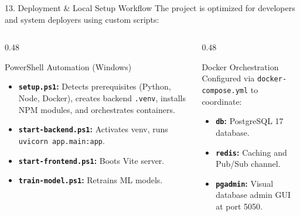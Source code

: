 \documentclass[10pt,aspectratio=169]{beamer}
\begin{document}
\begin{frame}{13. Deployment \& Local Setup Workflow}
    The project is optimized for developers and system deployers using custom scripts:
    
    \begin{columns}[T]
        \begin{column}{0.48\textwidth}
            \begin{block}{PowerShell Automation (Windows)}
                \begin{itemize}
                    \item \textbf{\texttt{setup.ps1}:} Detects prerequisites (Python, Node, Docker), creates backend \texttt{.venv}, installs NPM modules, and orchestrates containers.
                    \item \textbf{\texttt{start-backend.ps1}:} Activates venv, runs \texttt{uvicorn app.main:app}.
                    \item \textbf{\texttt{start-frontend.ps1}:} Boots Vite server.
                    \item \textbf{\texttt{train-model.ps1}:} Retrains ML models.
                \end{itemize}
            \end{block}
        \end{column}
        \begin{column}{0.48\textwidth}
            \begin{block}{Docker Orchestration}
                Configured via \texttt{docker-compose.yml} to coordinate:
                \begin{itemize}
                    \item \textbf{\texttt{db}:} PostgreSQL 17 database.
                    \item \textbf{\texttt{redis}:} Caching and Pub/Sub channel.
                    \item \textbf{\texttt{pgadmin}:} Visual database admin GUI at port 5050.
                \end{itemize}
            \end{block}
        \end{column}
    \end{columns}
\end{frame}
\end{document}
